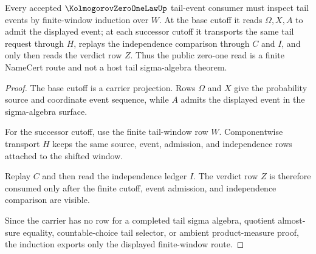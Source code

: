 \begin{theorem}
\label{thm:kolmogorov-zero-one-law-tail-event-induction}
Every accepted $\KolmogorovZeroOneLawUp$ tail-event consumer must inspect tail events by finite-window induction over $W$. At the base cutoff it reads $\Omega,X,A$ to admit the displayed event; at each successor cutoff it transports the same tail request through $H$, replays the independence comparison through $C$ and $I$, and only then reads the verdict row $Z$. Thus the public zero-one read is a finite NameCert route and not a host tail sigma-algebra theorem.
\end{theorem}
\begin{proof}
The base cutoff is a carrier projection. Rows $\Omega$ and $X$ give the probability source and coordinate event sequence, while $A$ admits the displayed event in the sigma-algebra surface.

For the successor cutoff, use the finite tail-window row $W$. Componentwise transport $H$ keeps the same source, event, admission, and independence rows attached to the shifted window.

Replay $C$ and then read the independence ledger $I$. The verdict row $Z$ is therefore consumed only after the finite cutoff, event admission, and independence comparison are visible.

Since the carrier has no row for a completed tail sigma algebra, quotient almost-sure equality, countable-choice tail selector, or ambient product-measure proof, the induction exports only the displayed finite-window route.
\end{proof}




